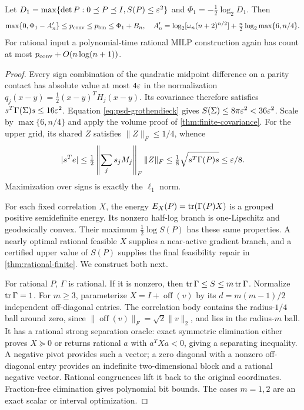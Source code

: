 \begin{theorem}\label{thm:l1-covariance}
Let $D_1=\max\{\det P:0\preceq P\preceq I,S(P)\le\varepsilon^2\}$ and
$\Phi_1=-\frac12\log_2D_1$. Then
\[
 \max\{0,\Phi_1-A'_n\}\le p_{\mathrm{conv}}\le p_{\mathrm{bin}}\le\Phi_1+B_n,
 \quad
 A'_n=\log_2[\omega_n(n+2)^{n/2}]
              +\tfrac n2\log_2\max\{6,n/4\}.
\]
For rational input a polynomial-time rational MILP construction again
has count at most $p_{\mathrm{conv}}+O(n\log(n+1))$.
\end{theorem}
\begin{proof}
Every sign combination of the quadratic midpoint difference on a parity
contact has absolute value at most $4\varepsilon$ in the normalization
$q_j(x-y)=\frac12(x-y)^TH_j(x-y)$. Its covariance therefore satisfies
$s^T\Gamma(\Sigma)s\le16\varepsilon^2$. Equation \eqref{eq:psd-grothendieck}
gives $S(\Sigma)\le8\pi\varepsilon^2<36\varepsilon^2$. Scale by $\max\{6,n/4\}$
and apply the volume proof of \cref{thm:finite-covariance}.
For the upper grid, its shared $Z$ satisfies $\|Z\|_F\le1/4$, whence
\[
 |s^Te|\le\tfrac12\left\|\sum_j s_jM_j\right\|_F\|Z\|_F
 \le\tfrac18\sqrt{s^T\Gamma(P)s}\le\varepsilon/8.
\]
Maximization over signs is exactly the $\ell_1$ norm.

For each fixed correlation $X$, the energy
$E_X(P)=\operatorname{tr}(\Gamma(P)X)$ is a grouped positive semidefinite energy.
Its nonzero half-log branch is one-Lipschitz and geodesically convex.
Their maximum $\frac12\log S(P)$ has these same properties. A nearly
optimal rational feasible $X$ supplies a near-active gradient branch,
and a certified upper value of $S(P)$ supplies the final feasibility
repair in \cref{thm:rational-finite}. We construct both next.

For rational $P$, $\Gamma$ is rational. If it is nonzero, then
$\operatorname{tr}\Gamma\le S\le m\operatorname{tr}\Gamma$. Normalize $\operatorname{tr}\Gamma=1$. For $m\ge3$,
parameterize $X=I+\operatorname{off}(v)$ by its $d=m(m-1)/2$ independent
off-diagonal entries. The correlation body contains the radius-$1/4$
ball around zero, since $\|\operatorname{off}(v)\|_F=\sqrt2\|v\|_2$,
and lies in the radius-$m$ ball. It has a rational strong separation
oracle: exact symmetric elimination either proves $X\succeq0$ or
returns rational $a$ with $a^TXa<0$, giving a separating inequality.
A negative pivot provides such a vector; a zero diagonal with a nonzero
off-diagonal entry provides an indefinite two-dimensional block and a
rational negative vector. Rational congruences lift it back to the original
coordinates. Fraction-free elimination gives polynomial bit bounds.
The cases $m=1,2$ are an exact scalar or interval optimization.


\end{proof}
